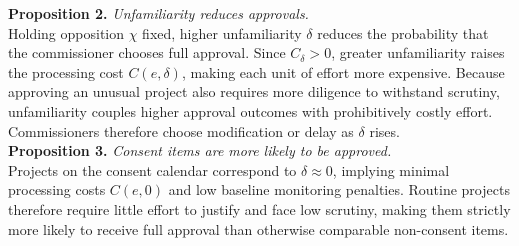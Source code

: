 \textbf{Proposition 2.} \textit{Unfamiliarity reduces approvals.}\\

Holding opposition $\chi$ fixed, higher unfamiliarity $\delta$ reduces the probability that the commissioner chooses full approval. Since $C_\delta > 0$, greater unfamiliarity raises the processing cost $C(e,\delta)$, making each unit of effort more expensive. Because approving an unusual project also requires more diligence to withstand scrutiny, unfamiliarity couples higher approval outcomes with prohibitively costly effort. Commissioners therefore choose modification or delay as $\delta$ rises.\\

\textbf{Proposition 3.} \textit{Consent items are more likely to be approved.}\\

Projects on the consent calendar correspond to $\delta \approx 0$, implying minimal processing costs $C(e,0)$ and low baseline monitoring penalties. Routine projects therefore require little effort to justify and face low scrutiny, making them strictly more likely to receive full approval than otherwise comparable non-consent items.\\